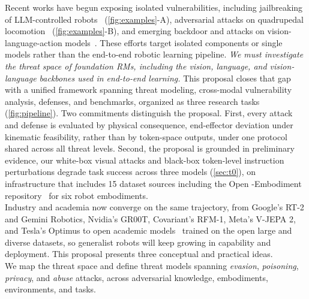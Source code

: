 \documentclass[11pt,letterpaper]{article}
\begin{document}
Recent works have begun exposing isolated vulnerabilities, including jailbreaking of LLM-controlled robots~\cite{robey2024jailbreaking}  (\autoref{fig:examples}-A), adversarial attacks on quadrupedal locomotion~\cite{shi2024rethinking,miki2022scirob,rslsubt2022}  (\autoref{fig:examples}-B), and emerging backdoor and attacks on vision-language-action models~\cite{badvla,advvla}. These efforts target isolated components or single models rather than the end-to-end robotic learning pipeline.
\emph{We must investigate the threat space of foundation RMs, including the vision, language, and vision-language backbones used in end-to-end learning.}
This proposal closes that gap with a unified framework spanning threat modeling, cross-modal
vulnerability analysis, defenses, and benchmarks, organized as three research tasks
(\autoref{fig:pipeline}). Two commitments distinguish the proposal. First, every attack and defense is evaluated by physical consequence, end-effector deviation under kinematic feasibility, rather than by token-space outputs, under one protocol shared across all threat levels. Second, the proposal is grounded in preliminary evidence, \eg our white-box visual attacks and black-box token-level instruction perturbations degrade task success across three models (\autoref{sec:t0}), on infrastructure that includes 15 dataset sources including the Open {\xo}-Embodiment repository~\cite{9} for six robot embodiments.
\\
Industry and academia now converge on the same trajectory, from Google's RT-2 and Gemini Robotics, Nvidia's GR00T, Covariant's RFM-1, Meta's V-JEPA 2, and Tesla's Optimus to open academic models~\cite{openvla_oft,qu2025spatialvla,kim2024openvla,team2024octo} trained on the open large and diverse datasets, so generalist robots will keep growing in capability and deployment.
This proposal presents three conceptual and practical ideas.
\\
We map the threat space and define threat models spanning \textit{evasion},
\textit{poisoning}, \textit{privacy}, and \textit{abuse} attacks, across adversarial knowledge, embodiments, environments, and tasks. 
\end{document}
